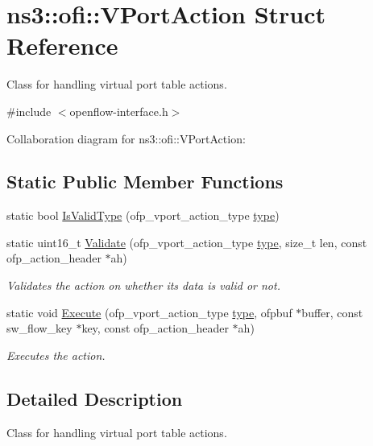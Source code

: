 \hypertarget{structns3_1_1ofi_1_1VPortAction}{}\section{ns3\+:\+:ofi\+:\+:V\+Port\+Action Struct Reference}
\label{structns3_1_1ofi_1_1VPortAction}


Class for handling virtual port table actions.  




{\ttfamily \#include $<$openflow-\/interface.\+h$>$}



Collaboration diagram for ns3\+:\+:ofi\+:\+:V\+Port\+Action\+:
\subsection*{Static Public Member Functions}
\begin{DoxyCompactItemize}
\item 
static bool \hyperlink{structns3_1_1ofi_1_1VPortAction_a6bc313ba26afb73d3c8425d9a8679303}{Is\+Valid\+Type} (ofp\+\_\+vport\+\_\+action\+\_\+type \hyperlink{visualizer-ideas_8txt_add98db9e15e2a58cf2b57623e7aa893a}{type})
\item 
static uint16\+\_\+t \hyperlink{structns3_1_1ofi_1_1VPortAction_a2a56171131dd28a20320a55c212be019}{Validate} (ofp\+\_\+vport\+\_\+action\+\_\+type \hyperlink{visualizer-ideas_8txt_add98db9e15e2a58cf2b57623e7aa893a}{type}, size\+\_\+t len, const ofp\+\_\+action\+\_\+header $\ast$ah)
\begin{DoxyCompactList}\small\item\em Validates the action on whether its data is valid or not. \end{DoxyCompactList}\item 
static void \hyperlink{structns3_1_1ofi_1_1VPortAction_ac340c90edc207b184ef7c299b82a1533}{Execute} (ofp\+\_\+vport\+\_\+action\+\_\+type \hyperlink{visualizer-ideas_8txt_add98db9e15e2a58cf2b57623e7aa893a}{type}, ofpbuf $\ast$buffer, const sw\+\_\+flow\+\_\+key $\ast$key, const ofp\+\_\+action\+\_\+header $\ast$ah)
\begin{DoxyCompactList}\small\item\em Executes the action. \end{DoxyCompactList}\end{DoxyCompactItemize}


\subsection{Detailed Description}
Class for handling virtual port table actions. 

